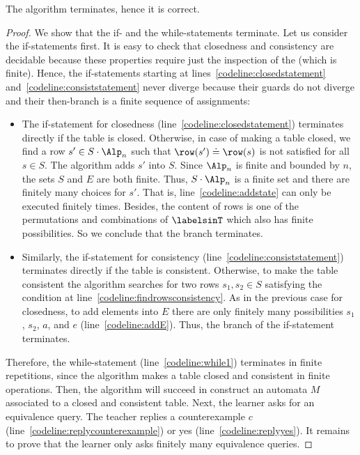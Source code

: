 \begin{theorem}\label{thm:correct}
  The algorithm terminates, hence it is correct.
\end{theorem}
\begin{proof}
  We show that the if- and the while-statements terminate.
  Let us consider the if-statements first.
  It is easy to check that  closedness and
  consistency are decidable because these properties require just the inspection of the
  \nOtable (which is finite).
  Hence, the if-statements starting at
  lines~\ref{codeline:closedstatement}
  and~\ref{codeline:consiststatement} never diverge because their
  guards do not diverge and their then-branch is a finite sequence of
  assignments:
  \begin{itemize}
  \item The if-statement for closedness
    (line~\ref{codeline:closedstatement}) terminates directly if the
    table is closed. Otherwise, in case of making a table closed, we
    find a row $s' \in S \cdot \Alp_n$ such that $\row(s')\doteq\row(s)$
    is not satisfied for all $s\in S$. The algorithm adds $s'$ into
    $S$. Since $\Alp_n$ is finite and bounded by $n$, the sets $S$ and
    $E$ are both finite. Thus, $S \cdot \Alp_n$ is a finite set and
    there are finitely many choices for $s'$. That is, 
    line~\ref{codeline:addstate} can only be executed finitely
    times. Besides, the content of rows is one of the permutations and
    combinations of $\labelsinT$ which also has finite
    possibilities. So we conclude that the branch terminates.
  \item Similarly, the if-statement for consistency
    (line~\ref{codeline:consiststatement}) terminates directly if the
    table is consistent. Otherwise, to make the table consistent the
    algorithm searches for two rows $s_1,s_2\in S$ satisfying the
    condition at line~\ref{codeline:findrowsconsistency}.
    As in the previous case for closedness, to add elements into $E$
    there are only finitely many possibilities $s_1$, $s_2$, $a$, and
    $e$ (line~\ref{codeline:addE}). Thus, the branch of the
    if-statement terminates.
\end{itemize}
  Therefore, the while-statement (line~\ref{codeline:while1}) terminates in finite repetitions, since the algorithm makes a table closed and consistent in finite operations. Then, the algorithm will succeed in construct an automata $M$ associated to a closed and consistent table. Next, the learner asks for an equivalence query. The teacher replies a counterexample $c$ (line~\ref{codeline:replycounterexample}) or yes (line~\ref{codeline:replyyes}). It remains to prove that the learner only asks finitely many equivalence queries.


\end{proof}

